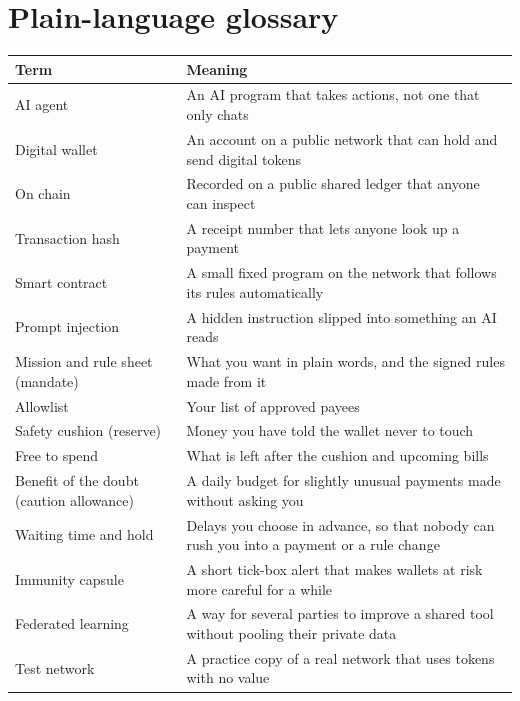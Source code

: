 \documentclass[11pt,a4paper]{article}
\renewcommand{\arraystretch}{1.2}
\begin{document}
\section*{Plain-language glossary}

\begin{table}[H]
\small\renewcommand{\arraystretch}{1.15}
\begin{tabularx}{\linewidth}{@{}P{44mm} L@{}}
\toprule
\textbf{Term} & \textbf{Meaning} \\
\midrule
AI agent & An AI program that takes actions, not one that only chats \\
Digital wallet & An account on a public network that can hold and send digital tokens \\
On chain & Recorded on a public shared ledger that anyone can inspect \\
Transaction hash & A receipt number that lets anyone look up a payment \\
Smart contract & A small fixed program on the network that follows its rules automatically \\
Prompt injection & A hidden instruction slipped into something an AI reads \\
Mission and rule sheet (mandate) & What you want in plain words, and the signed rules made from it \\
Allowlist & Your list of approved payees \\
Safety cushion (reserve) & Money you have told the wallet never to touch \\
Free to spend & What is left after the cushion and upcoming bills \\
Benefit of the doubt (caution allowance) & A daily budget for slightly unusual payments made without asking you \\
Waiting time and hold & Delays you choose in advance, so that nobody can rush you into a payment or a rule change \\
Immunity capsule & A short tick-box alert that makes wallets at risk more careful for a while \\
Federated learning & A way for several parties to improve a shared tool without pooling their private data \\
Test network & A practice copy of a real network that uses tokens with no value \\
\bottomrule
\end{tabularx}
\end{table}
\end{document}
